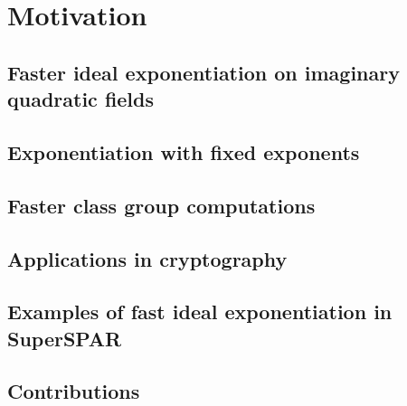 \documentclass{ucalgthes1}
\theoremstyle{definition}
\begin{document}
\chapter{Motivation}

\section{Faster ideal exponentiation on imaginary quadratic fields}

\section{Exponentiation with fixed exponents}

\section{Faster class group computations}

\section{Applications in cryptography}

\section{Examples of fast ideal exponentiation in SuperSPAR}

\section{Contributions}
\end{document}
